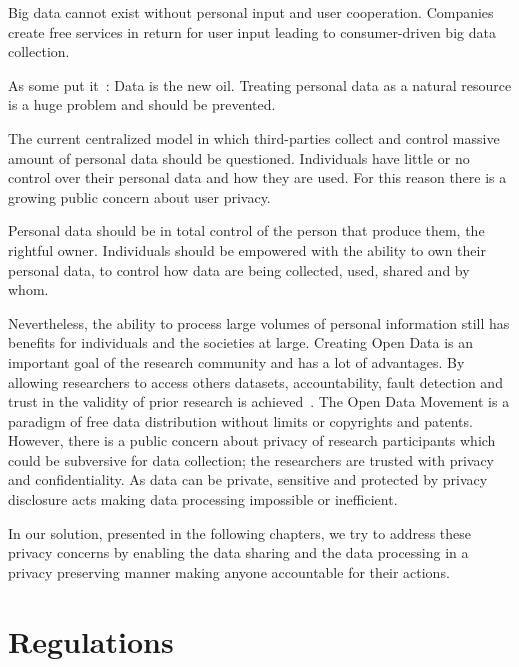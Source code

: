 Big data cannot exist without personal input and user cooperation. Companies create free services in return for user input leading to consumer-driven big data collection.

As some put it~\cite{data_new_oil_01,data_new_oil_02,data_new_oil_03,data_new_oil_04,data_new_oil_05,data_new_oil_05,data_new_oil_06,data_new_oil_07,data_new_oil_08,data_new_oil_09}: Data is the new oil. Treating personal data as a natural resource is a huge problem and should be prevented.

The current centralized model in which third-parties collect and control massive amount of personal data should be questioned. Individuals have little or no control over their personal data and how they are used. For this reason there is a growing public concern about user privacy.

Personal data should be in total control of the person that produce them, the rightful owner. Individuals should be empowered with the ability to own their personal data, to control how data are being collected, used, shared and by whom.

Nevertheless, the ability to process large volumes of personal information still has benefits for individuals and the societies at large. Creating Open Data is an important goal of the research community and has a lot of advantages. By allowing researchers to access others datasets, accountability, fault detection and trust in the validity of prior research is achieved~\cite{open_data_1}. The Open Data Movement is a paradigm of free data distribution without limits or copyrights and patents. However, there is a public concern about privacy of research participants which could be subversive for data collection; the researchers are trusted with privacy and confidentiality. As data can be private, sensitive and protected by privacy disclosure acts making data processing impossible or inefficient.

In our solution, presented in the following chapters, we try to address these privacy concerns by enabling the data sharing and the data processing in a privacy preserving manner making anyone accountable for their actions.

\section{Regulations}\label{problem:regulations}


